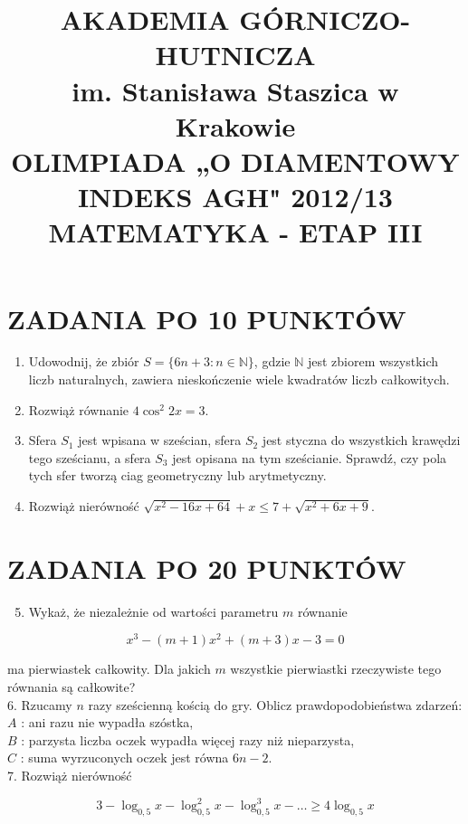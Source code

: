 \documentclass[10pt]{article}
\title{AKADEMIA GÓRNICZO-HUTNICZA \\
 im. Stanisława Staszica w Krakowie \\
 OLIMPIADA „O DIAMENTOWY INDEKS AGH" 2012/13 MATEMATYKA - ETAP III }
\author{}
\date{}
\begin{document}
\maketitle
\section*{ZADANIA PO 10 PUNKTÓW}
\begin{enumerate}
  \item Udowodnij, że zbiór $S=\{6 n+3: n \in \mathbb{N}\}$, gdzie $\mathbb{N}$ jest zbiorem wszystkich liczb naturalnych, zawiera nieskończenie wiele kwadratów liczb całkowitych.
  \item Rozwiąż równanie $4 \cos ^{2} 2 x=3$.
  \item Sfera $S_{1}$ jest wpisana w sześcian, sfera $S_{2}$ jest styczna do wszystkich krawędzi tego sześcianu, a sfera $S_{3}$ jest opisana na tym sześcianie. Sprawdź, czy pola tych sfer tworzą ciag geometryczny lub arytmetyczny.
  \item Rozwiąż nierówność $\sqrt{x^{2}-16 x+64}+x \leq 7+\sqrt{x^{2}+6 x+9}$.
\end{enumerate}

\section*{ZADANIA PO 20 PUNKTÓW}
\begin{enumerate}
  \setcounter{enumi}{4}
  \item Wykaż, że niezależnie od wartości parametru $m$ równanie
\end{enumerate}

$$
x^{3}-(m+1) x^{2}+(m+3) x-3=0
$$

ma pierwiastek całkowity. Dla jakich $m$ wszystkie pierwiastki rzeczywiste tego równania są całkowite?\\
6. Rzucamy $n$ razy sześcienną kością do gry. Oblicz prawdopodobieństwa zdarzeń:\\
$A$ : ani razu nie wypadła szóstka,\\
$B$ : parzysta liczba oczek wypadła więcej razy niż nieparzysta,\\
$C$ : suma wyrzuconych oczek jest równa $6 n-2$.\\
7. Rozwiąż nierówność

$$
3-\log _{0,5} x-\log _{0,5}^{2} x-\log _{0,5}^{3} x-\ldots \geq 4 \log _{0,5} x
$$
\end{document}
